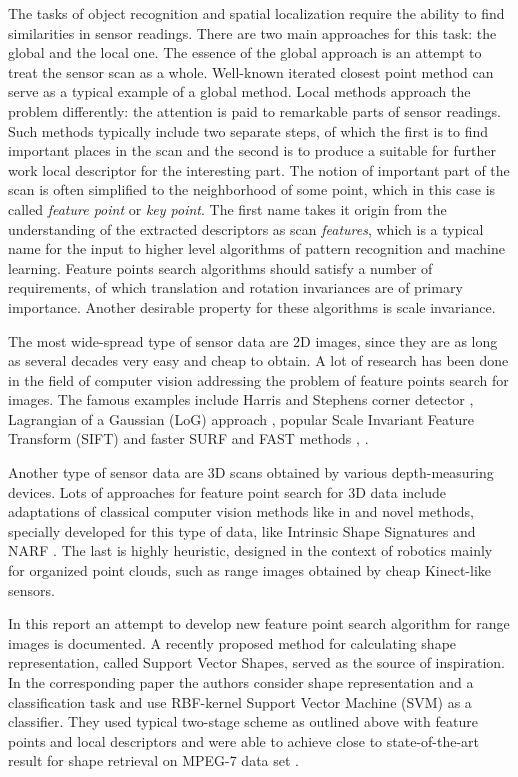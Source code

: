 The tasks of object recognition and spatial localization require the ability to find similarities in sensor readings. There are two main approaches for this task: the global and the local one. The essence of the global approach is an attempt to treat the sensor scan as a whole. Well-known iterated closest point method \cite{besl1992method} can serve as a typical example of a global method. Local methods approach the problem differently: the attention is paid to remarkable parts of sensor readings. Such methods typically include two separate steps, of which the first is to find important places in the scan and the second is to produce a suitable for further work local descriptor  for the interesting part. The notion of important part of the scan is often simplified to the neighborhood of some point, which in this case is called \textit{feature point} or \textit{key point}. The first name takes it origin from   
the understanding of the extracted descriptors as scan \textit{features}, which is a typical name for the input to higher level algorithms of pattern recognition and machine learning. Feature points search algorithms should satisfy a number of requirements, of which translation and rotation invariances are of primary importance. Another desirable property for these algorithms is scale invariance.

The most wide-spread type of sensor data are 2D images, since they are as long as several decades very easy and cheap to obtain. A lot of research has been done in the field of computer vision addressing the problem of feature points search for images. The famous examples include Harris and Stephens corner detector \cite{harris1988combined}, Lagrangian of a Gaussian (LoG) approach \cite{lindeberg1998feature}, popular Scale Invariant Feature Transform (SIFT) \cite{lowe2004distinctive} and faster SURF and FAST methods \cite{bay2006surf}, \cite{rosten2010faster}.

Another type of sensor data are 3D scans obtained by various depth-measuring devices. Lots of approaches for feature point search for 3D data include adaptations of classical computer vision methods like in \cite{sipiran2011harris} and novel methods, specially developed for this type of data, like Intrinsic Shape Signatures \cite{zhong2009intrinsic} and NARF \cite{steder2011point}. The last is highly heuristic, designed in the context of robotics mainly for organized point clouds, such as range images obtained by cheap Kinect-like sensors.

In this report an attempt to develop new feature point search algorithm for range images is documented. A recently proposed method for calculating shape representation, called Support Vector Shapes, served as the source of inspiration. In the corresponding paper  \cite{SVS2013} the authors consider shape representation and a classification task and use RBF-kernel Support Vector Machine (SVM) \cite{cortes1995support} as a classifier. They used typical two-stage scheme as outlined above with feature points and local descriptors and were able to achieve close to state-of-the-art result for shape retrieval on MPEG-7 data set \cite{latecki2000shape}. 

